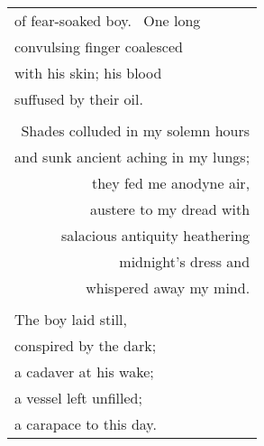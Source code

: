 \documentclass{article}
\begin{document}
\begin{center}
\begin{tabular}{l}
of fear-soaked boy.  One long \\
convulsing finger coalesced \\
with his skin; his blood \\
suffused by their oil. \\
\\
\multicolumn{1}{r}{Shades colluded in my solemn hours} \\
\multicolumn{1}{r}{and sunk ancient aching in my lungs;} \\
\multicolumn{1}{r}{they fed me anodyne air,} \\
\multicolumn{1}{r}{austere to my dread with} \\
\multicolumn{1}{r}{salacious antiquity heathering} \\
\multicolumn{1}{r}{midnight's dress and} \\
\multicolumn{1}{r}{whispered away my mind.} \\
\\
The boy laid still, \\
conspired by the dark; \\
a cadaver at his wake; \\
a vessel left unfilled; \\
a carapace to this day. \\
\end{tabular}
\end{center}
\end{document}
